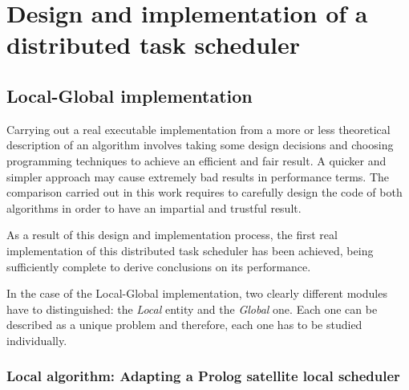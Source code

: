 
\chapter{Design and implementation of a distributed task scheduler} %

\label{Chapter3} %


\section{Local-Global implementation}
\label{LGimplementation}

Carrying out a real executable implementation from a more or less theoretical description of an algorithm involves taking some design decisions and choosing programming techniques to achieve an efficient and fair result. A quicker and simpler approach may cause extremely bad results in performance terms. The comparison carried out in this work requires to carefully design the code of both algorithms in order to have an impartial and trustful result.

As a result of this design and implementation process, the first real implementation of this distributed task scheduler has been achieved, being sufficiently complete to derive conclusions on its performance.

In the case of the Local-Global implementation, two clearly different modules have to distinguished: the \emph{Local} entity and the \emph{Global} one. Each one can be described as a unique problem and therefore, each one has to be studied individually.

\subsection{Local algorithm: Adapting a Prolog satellite local scheduler}


